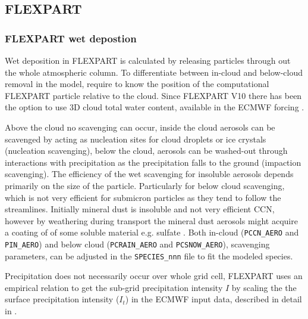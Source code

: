 
\subsection{FLEXPART}

\subsubsection{FLEXPART wet depostion}
Wet deposition in FLEXPART is calculated by releasing particles through out the
whole atmospheric column. To differentiate between in-cloud and below-cloud
removal in the model, require to know the position of the computational FLEXPART
particle relative to the cloud. Since FLEXPART V10 there has been the option to
use 3D cloud total water content, available in the ECMWF forcing
\parencite{flexpart_wetdep}.  

Above the cloud no scavenging can occur, inside the cloud aerosols can be
scavenged by acting as nucleation sites for cloud droplets or
ice crystals (nucleation scavenging), below the cloud, aerosols can be washed-out
through interactions with precipitation as the precipitation falls to the ground
(impaction scavenging). The efficiency of the wet scavenging for insoluble aerosols 
depends primarily on the size of the particle. Particularly for below cloud 
scavenging, which is not very efficient for submicron particles as they tend to
follow the streamlines. Initially mineral dust is insoluble and not very efficient CCN,
however by weathering during transport the mineral dust aerosols might acquire a coating of
of some soluble material e.g. sulfate \textcite{Dust_aerosols_coating2001}. Both in-cloud
(\verb|PCCN_AERO| and \verb|PIN_AERO|) and below cloud (\verb|PCRAIN_AERO| and \verb|PCSNOW_AERO|),  
scavenging parameters, can be adjusted in the \verb|SPECIES_nnn| file to fit the
modeled species.     

Precipitation does not necessarily occur over whole grid cell,
FLEXPART uses an empirical relation to get the sub-grid precipitation intensity
$ I $ by scaling the  the surface precipitation intensity ($ I_t $) in the ECMWF
input data, described in detail in \textcite{Flexpart-2005_ref_paper}.   

